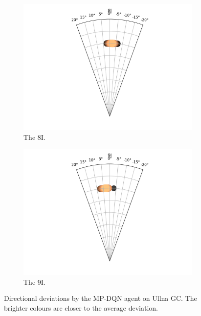\documentclass{kththesis}
\begin{document}
\begin{figure}
\begin{subfigure}{0.4\textwidth}
    \centering
    \includegraphics[width=\textwidth]{AgentDirectionChoices/MPDQN_Ullna_Direction_Choices_8I.png} 
    \caption{The 8I.}
    \label{fig:8I_ullna_deviation}
    \end{subfigure}
    \begin{subfigure}{0.4\textwidth}
    \centering
    \includegraphics[width=\textwidth]{AgentDirectionChoices/MPDQN_Ullna_Direction_Choices_9I.png} 
    \caption{The 9I.}
    \label{fig:9I_ullna_deviation}
    \end{subfigure}
    \caption{Directional deviations by the MP-DQN agent on Ullna GC. The brighter colours are closer to the average deviation.}
\end{figure}
\end{document}
